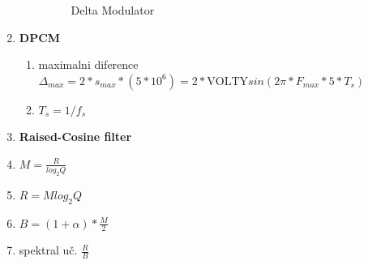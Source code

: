 \begin{enumerate}
\begin{enumerate}
\begin{figure}[h!]
        \caption{Delta Modulator}
        \label{fig:enter-label}
    \end{figure}
    \end{enumerate}
    \item\textbf{DPCM}
    \begin{enumerate}
        \item maximalni diference $\Delta_{max}=2*s_{max}*(5*10^6)=2*\mathrm{VOLTY}sin(2\pi*F_{max}*5*T_s)$
        \item$ T_s=1/f_s$
    \end{enumerate}
    \item \textbf{Raised-Cosine filter}
    \item $M=\frac{R}{log_2Q}$
    \item $R=Mlog_2Q$
    \item $B=(1+\alpha)*\frac{M}{2}$
    \item spektral uč. $\frac{R}{B}$
    
\end{enumerate}

